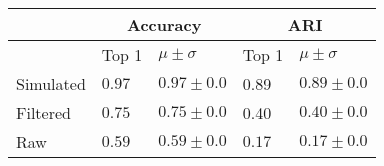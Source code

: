 \begin{tabular}{lllll}
\toprule
{} & \multicolumn{2}{c}{Accuracy} &   \multicolumn{2}{c}{ARI} \\
\midrule
{} & Top 1 & $\mu \pm \sigma$ &  Top 1 & $\mu \pm \sigma$ \\
Simulated &  $0.97$ & $0.97 \pm 0.0 $ &  0.89 & $0.89 \pm 0.0 $ \\
Filtered  &   $0.75$  & $0.75 \pm 0.0$ &  0.40 & $0.40 \pm 0.0$ \\
Raw &   $0.59$ &  $0.59\pm 0.0$ & $0.17$ & $0.17\pm 0.0$ \\
\bottomrule
\end{tabular}
